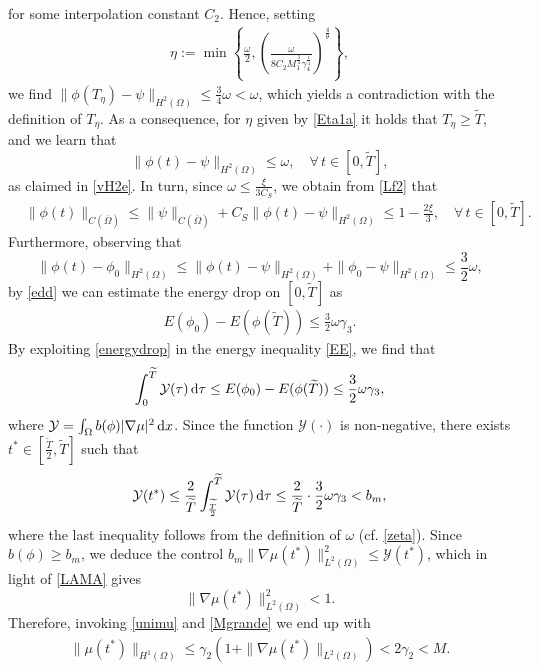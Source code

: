 \documentclass[11pt,reqno]{amsart}
\theoremstyle{remark}
\def\d{{\rm d}}
\numberwithin{equation}{section}
\def\d{{\rm d}}
\newcommand{\vp}{\phi}
\begin{document}
for some interpolation constant $C_2$.
Hence, setting
\begin{align}
\eta:=\min\left\{\frac{\omega}{2},
\left(\frac{\omega}{8 C_2 M_1^{\frac34}\gamma_4^{\frac14}}\right)^\frac{4}{\theta}\right\},\label{Eta1a}
\end{align}
 we find $\|\vp(T_\eta)-\psi\|_{H^2(\Omega)}\leq \frac{3}{4}\omega<\omega$, which yields
 a contradiction with the definition of $T_\eta$.
 As a consequence, for $\eta$ given by \eqref{Eta1a} it holds that $T_\eta\geq \widetilde{T}$, and we learn that
$$
\|\vp(t)-\psi \|_{H^2(\Omega)} \leq \omega, \quad \forall \,  t\in [0, \widetilde{T}],$$
as claimed in \eqref{vH2e}. In turn, since $\omega\leq\frac{\xi}{3C_S}$, we obtain from \eqref{Lf2} that
 \begin{align}
 &\|\vp(t)\|_{C(\overline{\Omega})}
 \leq \|\psi\|_{C(\overline{\Omega})}
 +C_S\|\vp(t)-\psi\|_{H^2(\Omega)}
 \leq 1-\frac{2\xi}{3}, \quad 
\forall \, t\in [0,\widetilde{T}]. 
 \label{dfdf1}
 \end{align}
Furthermore, observing that
\begin{equation*}
\|\vp(t)-\vp_0\|_{H^2(\Omega)}
 \leq \|\vp(t)-\psi\|_{H^2(\Omega)}
 +\|\vp_0-\psi\|_{H^2(\Omega)}
 \leq \frac32\omega,%
 \end{equation*}
by \eqref{edd} we can estimate  the energy drop on $[0,\widetilde{T}]$ as
 \begin{align}
 E(\vp_0)-E(\vp(\widetilde{T}))\leq \frac32\omega\gamma_3. \label{energydrop}
 \end{align}
By exploiting \eqref{energydrop} in the energy inequality \eqref{EE}, we find that
$$ 
\int_0^{\widetilde{T}} \mathcal{Y}(\tau) \, \d\tau\leq E(\vp_0)-E(\vp(\widetilde{T}))\leq \frac32\omega\gamma_3,
$$
where $\mathcal{Y}=\int_\Omega b(\phi)|\nabla \mu|^2 \, \d x$.
Since the function $\mathcal{Y}(\cdot)$ is non-negative, there exists
$t^*\in \left[ \frac{\widetilde{T}}{2}, \widetilde{T}\right]$ such that
 \begin{equation}
 \label{LAMA}
 \mathcal{Y}(t^*)\leq \frac{2}{\widetilde{T}}\int_{\frac{\widetilde{T}}{2}}^{\widetilde{T}} \mathcal{Y}(\tau) \, \d\tau\leq
 \frac{2}{\widetilde{T}}\cdot \frac32\omega \gamma_3 < b_m,
 \end{equation}
where the last inequality follows from the definition of $\omega$ (cf. \eqref{zeta}).
Since $b(\phi)\geq b_m$, we deduce the control
$b_m\|\nabla\mu(t^*)\|_{L^2(\Omega)}^2\leq \mathcal{Y}(t^*)$, which in light of \eqref{LAMA} gives
$$\|\nabla\mu(t^*)\|_{L^2(\Omega)}^2<1.$$
Therefore, invoking \eqref{unimu} and \eqref{Mgrande} we end up with
  \begin{align}
 \|\mu(t^*)\|_{H^1(\Omega)}\leq  \gamma_2\left( 1+\|\nabla \mu(t^*)\|_{L^2(\Omega)}\right)
 < 2\gamma_2<M.\label{H3new}
 \end{align}
\end{document}
